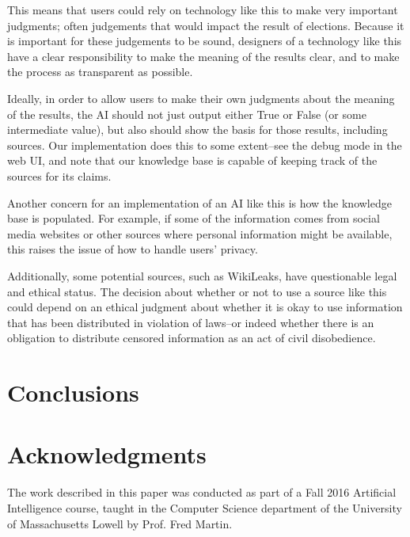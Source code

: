 \documentclass{chi2009}
\begin{document}
This means that users could rely on technology like this to make very important judgments; often judgements that would impact the result of elections.
Because it is important for these judgements to be sound, designers of a technology like this have a clear responsibility to make the meaning of the results clear, and to make the process as transparent as possible.

Ideally, in order to allow users to make their own judgments about the meaning of the results, the AI should not just output either True or False (or some intermediate value), but also should show the basis for those results, including sources.
Our implementation does this to some extent--see the debug mode in the web UI, and note that our knowledge base is capable of keeping track of the sources for its claims.

Another concern for an implementation of an AI like this is how the knowledge base is populated.
For example, if some of the information comes from social media websites or other sources where personal information might be available, this raises the issue of how to handle users' privacy.

Additionally, some potential sources, such as WikiLeaks, have questionable legal and ethical status.
The decision about whether or not to use a source like this could depend on an ethical judgment about whether it is okay to use information that has been distributed in violation of laws--or indeed whether there is an obligation to distribute censored information as an act of civil disobedience.

\section{Conclusions}


\section{Acknowledgments}

The work described in this paper was conducted as part of a Fall 2016 Artificial Intelligence course, taught in the Computer Science department of the University of Massachusetts Lowell by Prof. Fred Martin.



\end{document}
